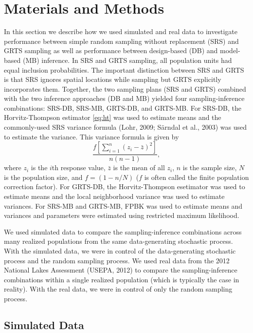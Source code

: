 \documentclass[]{elsarticle} %
\begin{document}
\hypertarget{sec:mm}{%
\section{Materials and Methods}\label{sec:mm}}

In this section we describe how we used simulated and real data to
investigate performance between simple random sampling without
replacement (SRS) and GRTS sampling as well as performance between
design-based (DB) and model-based (MB) inference. In SRS and GRTS
sampling, all population units had equal inclusion probabilities. The
important distinction between SRS and GRTS is that SRS ignores spatial
locations while sampling but GRTS explicitly incorporates them.
Together, the two sampling plans (SRS and GRTS) combined with the two
inference approaches (DB and MB) yielded four sampling-inference
combinations: SRS-DB, SRS-MB, GRTS-DB, and GRTS-MB. For SRS-DB, the
Horvitz-Thompson estimator \eqref{eq:ht} was used to estimate means and
the commonly-used SRS variance formula (Lohr, 2009; Särndal et al.,
2003) was used to estimate the variance. This variance formula is given
by \begin{equation}\label{equation:srs_var}
 \frac{f[\sum_{i = 1}^n (z_i - \bar{z})^2]}{n(n - 1)},
\end{equation} where \(z_i\) is the \(i\)th response value, \(\bar{z}\)
is the mean of all \(z_i\), \(n\) is the sample size, \(N\) is the
population size, and \(f = (1 - n / N)\) (\(f\) is often called the
finite population correction factor). For GRTS-DB, the Horvitz-Thompson
esetimator was used to estimate means and the local neighborhood
variance was used to estimate variances. For SRS-MB and GRTS-MB, FPBK
was used to estimate means and variances and parameters were estimated
using restricted maximum likelihood.

We used simulated data to compare the sampling-inference combinations
across many realized populations from the same data-generating
stochastic process. With the simulated data, we were in control of the
data-generating stochastic process and the random sampling process. We
used real data from the 2012 National Lakes Assessment (USEPA, 2012) to
compare the sampling-inference combinations within a single realized
population (which is typically the case in reality). With the real data,
we were in control of only the random sampling process.

\hypertarget{sec:mm_sim}{%
\subsection{Simulated Data}\label{sec:mm_sim}}
\end{document}
